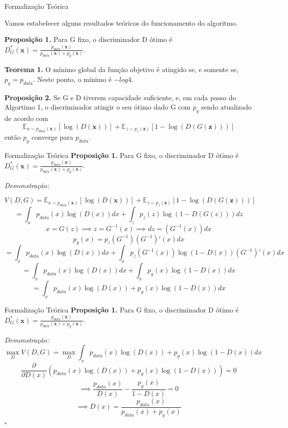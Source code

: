 \documentclass[10pt]{beamer}
\newcommand*{\QEDB}{\hfill\ensuremath{\square}}%
\begin{document}
\begin{frame}[fragile]{Formalização Teórica}
	
	Vamos estabelecer alguns resultados teóricos do funcionamento
	do algoritmo.

	\small
	\textbf{Proposição 1.} Para G fixo, o discriminador D ótimo é
	$
	D^*_G(\bm x) = \frac{p_{data}(\bm x)}
	{p_{data}(\bm x) + p_g(\bm x)}
	$.

	\hfill
	\break
	\textbf{Teorema 1.} O mínimo global da função objetivo
	é atingido se, e somente se, $p_g = p_{data}$. Neste ponto,
	o mínimo é $-log 4$.

	\hfill
	\break
	\textbf{Proposição 2.} Se G e D tiverem capacidade suficiente,
	e, em cada passo do Algortimo 1, o discriminador atingir o seu
	ótimo dado G com $p_g$ sendo atualizado de acordo com
    $$
    \mathbb{E}_{x\sim p_{data}(\bm x)}\left[\log{(D(\bm x))}\right]+
    \mathbb{E}_{z\sim p_z(\bm z)}\left[1-\log{(D(G(\bm z)))}\right]
    $$
    então $p_g$ converge para $p_{data}$.

\end{frame}

\begin{frame}[fragile]{Formalização Teórica}
\small
	\textbf{Proposição 1.} Para G fixo, o discriminador D ótimo é
	$
	D^*_G(\bm x) = \frac{p_{data}(\bm x)}
	{p_{data}(\bm x) + p_g(\bm x)}
	$.

	\textit{Demonstração:}

  $$V(D,G)=
    \mathbb{E}_{x\sim p_{data}(\bm x)}\left[\log{(D(\bm x))}\right]+
    \mathbb{E}_{z\sim p_z(\bm z)}\left[1-\log{(D(G(\bm z)))}\right]
  $$
  \pause
  $$= \int_x p_{data}(x)\log{(D(x))}dx + \int_z p_z(z)\log{(1-D(G(z)))}dz $$
  \pause
  $$x = G(z) \implies z = G^{-1}(x) \implies dz = (G^{-1}(x))dx $$
  $$p_g(x) = p_z(G^{-1})(G^{-1})'(x)dx $$
  \pause
  $$= \int_x p_{data}(x)\log{(D(x))}dx + \int_x p_z(G^{-1}(x))\log{(1-D(x))}(G^{-1})'(x)dx $$
  \pause
  $$= \int_x p_{data}(x)\log{(D(x))}dx + \int_x p_g(x)\log{(1-D(x))}dx $$
  \pause
  $$= \int_x p_{data}(x)\log{(D(x))} + p_g(x)\log{(1-D(x))}dx $$
\end{frame}

\begin{frame}[fragile]{Formalização Teórica}
\small
	\textbf{Proposição 1.} Para G fixo, o discriminador D ótimo é
	$
	D^*_G(\bm x) = \frac{p_{data}(\bm x)}
	{p_{data}(\bm x) + p_g(\bm x)}
	$.

	\textit{Demonstração:}
 $$\max_{D} V(D,G) = \max_{D}\int_x p_{data}(x)\log{(D(x))} + p_g(x)\log{(1-D(x))}dx $$
 \pause
 $$\frac{\partial}{\partial D(x)} \left(p_{data}(x)\log{(D(x))} + p_g(x)\log{(1-D(x))}\right) = 0 $$
 \pause
 $$\implies \dfrac{p_{data}(x)}{D(x)} - \dfrac{p_g(x)}{1 - D(x)} = 0 $$
 $$\implies D(x) = \dfrac{p_{data}(x)}{p_{data}(x)+p_g(x)} $$
 \QEDB
\end{frame}
\end{document}
